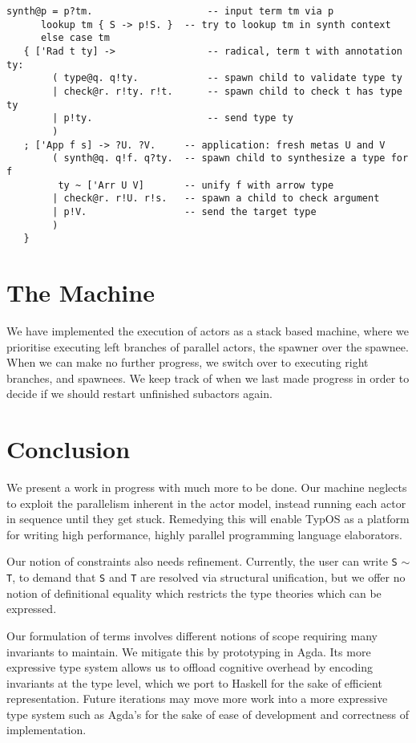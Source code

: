 \documentclass{easychair}
\newcommand{\TypOS}{TypOS\xspace}
\newcommand{\tm}[1]{\texttt{#1}\;}
\newcommand{\ty}[1]{\tm{#1}}
\newcommand{\constrain}[2]{#1 $\sim$ #2}
\begin{document}
\begin{lstlisting}[columns=fullflexible,keepspaces=true]
synth@p = p?tm.                    -- input term tm via p
	  lookup tm { S -> p!S. }  -- try to lookup tm in synth context
	  else case tm
   { ['Rad t ty] ->                -- radical, term t with annotation ty:
        ( type@q. q!ty.            -- spawn child to validate type ty
        | check@r. r!ty. r!t.      -- spawn child to check t has type ty
        | p!ty.                    -- send type ty
        )
   ; ['App f s] -> ?U. ?V.     -- application: fresh metas U and V
        ( synth@q. q!f. q?ty.  -- spawn child to synthesize a type for f
         ty ~ ['Arr U V]       -- unify f with arrow type
        | check@r. r!U. r!s.   -- spawn a child to check argument
        | p!V.	               -- send the target type
        )
   }
\end{lstlisting}

\section*{The Machine} %

We have implemented the execution of actors as a stack based machine,
where we prioritise executing left branches of parallel actors, the
spawner over the spawnee. When we can make no further progress, we
switch over to executing right branches, and spawnees. We keep track
of when we last made progress in order to decide if we should restart
unfinished subactors again.


\section*{Conclusion} %
We present a work in progress with much more to be done. Our machine neglects to exploit the parallelism inherent in the actor model, instead running each actor in sequence until they get stuck. Remedying this will enable \TypOS as a platform for writing high performance, highly parallel programming language elaborators.

Our notion of constraints also needs refinement. Currently, the user can write \constrain{\ty{S}\!}{\ty{T}}, to demand that \ty{S} and \ty{T} are resolved via structural unification, but we offer no notion of definitional equality which restricts the type theories which can be expressed.

Our formulation of terms involves different notions of scope requiring many invariants to maintain.
We mitigate this by prototyping in Agda. Its more expressive type system allows us to offload cognitive overhead by encoding invariants at the type level, which we port to Haskell for the sake of efficient representation. Future iterations may move more work into a more expressive type system such as Agda's for the sake of ease of development and correctness of implementation.
\end{document}

